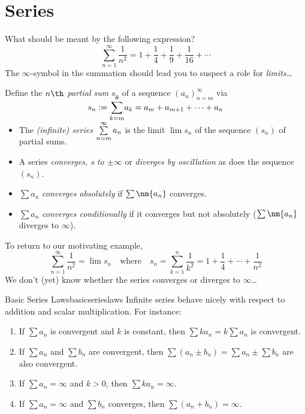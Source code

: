 \graphicspath{{notes/3series/asy/}}

\thispagestyle{empty}

\setcounter{section}{13}
\section{Series}\label{sec:series}


What should be meant by the following expression?
\[\sum_{n=1}^\infty \frac 1{n^2}=1+\frac 14+\frac 19+\frac 1{16}+\cdots\]
The \emph{$\infty$}-symbol in the summation should lead you to suspect a role for \emph{limits\ldots}

\begin{defn}{}{}
	Define the \emph{$n\th$ partial sum} $s_n$ of a sequence $(a_n)_{n=m}^\infty$ via
	\[s_n:=\smash{\sum_{k=m}^n}a_k=a_m+a_{m+1}+\cdots+a_n\]
	\begin{itemize}
	  \item The \emph{(infinite) series}\footnotemark{} $\smash[b]{\sum\limits_{n=m}^\infty a_n}$ is the limit $\lim s_n$ of the sequence $(s_n)$ of partial sums.
	  \item A series \emph{converges, s to $\pm\infty$} or \emph{diverges by oscillation} as does the sequence $(s_n)$.
	  \item $\sum a_n$ \emph{converges absolutely} if $\sum\nm{a_n}$ converges.
	  \item $\sum a_n$ \emph{converges conditionally} if it converges but not absolutely ($\sum \nm{a_n}$ diverges to $\infty$).
	\end{itemize}
\end{defn}


To return to our motivating example,
\[
	\sum_{n=1}^\infty \frac 1{n^2}=\lim s_n\quad\text{where}\quad s_n=\sum\limits_{k=1}^n \frac 1{k^2}=1+\frac 14+\cdots+\frac 1{n^2}
\]
We don't (yet) know whether the series converges or diverges to $\infty$\ldots

\begin{thm}{Basic Series Laws}{basicserieslaws}
	Infinite series behave nicely with respect to addition and scalar multiplication. For instance:
	\begin{enumerate}
	  \item If $\sum a_n$ is convergent and $k$ is constant, then $\sum ka_n=k\sum a_n$ is convergent.
	  \item If $\sum a_n$ and $\sum b_n$ are convergent, then $\sum(a_n\pm b_n)=\sum a_n\pm\sum b_n$ are also convergent.
	  \item If $\sum a_n=\infty$ and $k>0$, then $\sum ka_n=\infty$.
	  \item If $\sum a_n=\infty$ and $\sum b_n$ converges, then $\sum(a_n+b_n)=\infty$.
	\end{enumerate}
\end{thm}

